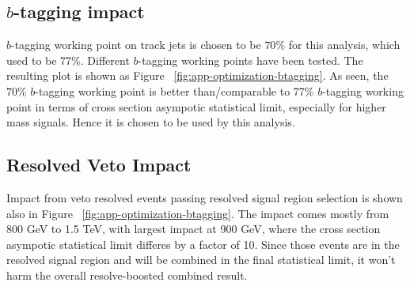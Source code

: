 \clearpage
\subsection{$b$-tagging impact}
\label{sec:app-optimization-btagging}
$b$-tagging working point on track jets is chosen to be $70\%$ for this analysis, which used to be 77\%. Different $b$-tagging working points have been tested. The resulting plot is shown as Figure ~\ref{fig:app-optimization-btagging}. As seen, the $70\%$ $b$-tagging working point is better than/comparable to 77\% $b$-tagging working point in terms of cross section asympotic statistical limit, especially for higher mass signals. Hence it is chosen to be used by this analysis.

\subsection{Resolved Veto Impact}
\label{sec:app-optimization-resveto}
Impact from veto resolved events passing resolved signal region selection is shown also in Figure ~\ref{fig:app-optimization-btagging}. The impact comes mostly from 800 GeV to 1.5 TeV, with largest impact at 900 GeV, where the cross section asympotic statistical limit differes by a factor of 10. Since those events are in the resolved signal region and will be combined in the final statistical limit, it won't harm the overall resolve-boosted combined result.

